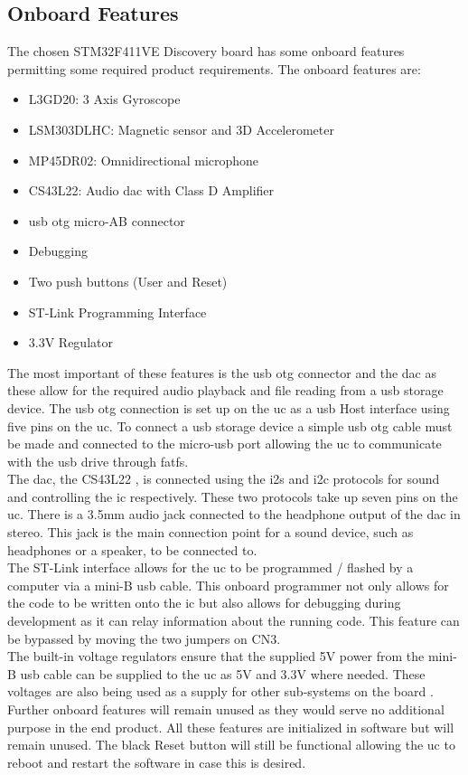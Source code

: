 \documentclass[12pt,a4paper]{report}
\begin{document}
\subsection{Onboard Features}
The chosen STM32F411VE Discovery board has some onboard features \cite{f411brd} permitting some required product requirements. The onboard features are:
\begin{itemize}
	\item L3GD20: 3 Axis Gyroscope 
	\item LSM303DLHC: Magnetic sensor and 3D Accelerometer
	\item MP45DR02: Omnidirectional microphone
	\item CS43L22: Audio \ac{dac} with Class D Amplifier
	\item \ac{usb} \ac{otg} micro-AB connector
	\item Debugging 
	\item Two push buttons (User and Reset)
	\item ST-Link Programming Interface
	\item 3.3V Regulator
\end{itemize}
The most important of these features is the \ac{usb} \ac{otg} connector and the \ac{dac} as these allow for the required audio playback and file reading from a \ac{usb} storage device. The \ac{usb} \ac{otg} connection is set up on the \ac{uc} as a \ac{usb} Host interface using five pins on the \ac{uc}. To connect a \ac{usb} storage device a simple \ac{usb} \ac{otg} cable must be made and connected to the micro-\ac{usb} port allowing the \ac{uc} to communicate with the \ac{usb} drive through \ac{fatfs}. \\
The \ac{dac}, the CS43L22 \cite{dac}, is connected using the \ac{i2s} and \ac{i2c} protocols for sound and controlling the \ac{ic} respectively. These two protocols take up seven pins on the \ac{uc}. There is a 3.5mm audio jack connected to the headphone output of the \ac{dac} in stereo. This jack is the main connection point for a sound device, such as headphones or a speaker, to be connected to.\\
The ST-Link interface \cite{f411brd} allows for the \ac{uc} to be programmed / flashed by a computer via a mini-B \ac{usb} cable. This onboard programmer not only allows for the code to be written onto the \ac{ic} but also allows for debugging during development as it can relay information about the running code. This feature can be bypassed by moving the two jumpers on CN3.\\
The built-in voltage regulators ensure that the supplied 5V power from the mini-B \ac{usb} cable can be supplied to the \ac{uc} as 5V and 3.3V where needed. These voltages are also being used as a supply for other sub-systems on the board \cite{f411brd}.\\
Further onboard features will remain unused as they would serve no additional purpose in the end product. All these features are initialized in software but will remain unused. The black Reset button will still be functional allowing the \ac{uc} to reboot and restart the software in case this is desired. 
\newpage
\end{document}
